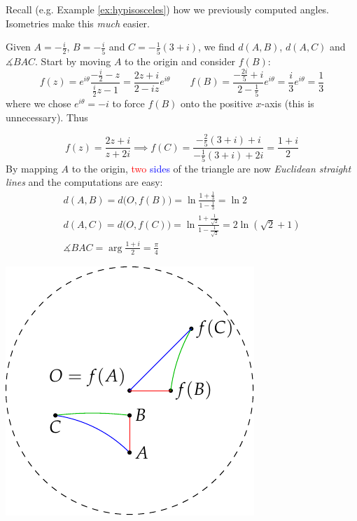 \goodbreak

Recall (e.g.{} Example \ref{ex:hypisosceles}) how we previously computed angles. Isometries make this \emph{much} easier. 

\begin{example}{}{}
Given $A=-\frac i2$, $B=-\frac i5$ and $C=-\frac 1{5}(3+i)$, we find $d(A,B)$, $d(A,C)$ and $\measuredangle BAC$.\smallbreak
Start by moving $A$ to the origin and consider $f(B)$:
\[f(z)=e^{i\theta}\frac{-\frac i2-z}{\frac i2z-1} =\frac{2z+i}{2-iz}e^{i\theta} \qquad f(B)=\frac{-\frac{2i}5+i}{2-\frac 15}e^{i\theta} =\frac i3e^{i\theta}=\frac 13\]
where we chose $e^{i\theta}=-i$ to force $f(B)$ onto the positive $x$-axis (this is unnecessary). Thus\par
\begin{minipage}[t]{0.64\linewidth}\vspace{-10pt}
\[f(z)=\frac{2z+i}{z+2i}\implies f(C)=\frac{-\frac 25(3+i)+i}{-\frac 15(3+i)+2i}=\frac{1+i}2\]
By mapping $A$ to the origin, \textcolor{red}{two} \textcolor{blue}{sides} of the triangle are now \emph{Euclidean straight lines} and the computations are easy:
\begin{gather*}
  d(A,B)=d\bigl(O,f(B)\bigr)=\ln\frac{1+\frac 13}{1-\frac 13}=\ln 2\\
  d(A,C)=d\bigl(O,f(C)\bigr)=\ln\frac{1+\frac 1{\sqrt 2}}{1-\frac 1{\sqrt 2}}=2\ln (\sqrt 2+1)\\[-3pt]
  \measuredangle BAC=\arg\frac{1+i}2=\frac\pi 4
\end{gather*}
\end{minipage}\hfill
\begin{minipage}[t]{0.34\linewidth}\vspace{-2pt}
\flushright\includegraphics[scale=0.9]{calc-triangle}
\end{minipage}\bigbreak
\end{example}



